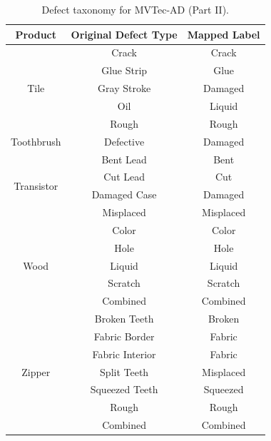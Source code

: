 \begin{table}
\centering
\footnotesize
\caption{Defect taxonomy for MVTec-AD (Part II).}
\label{tab:mvtec-mapping2}
\begin{tabular}{@{}ccc@{}}
\toprule
\textbf{Product} & \textbf{Original Defect Type} & \textbf{Mapped Label} \\
\midrule
\multirow{5}{*}{Tile} & Crack & Crack \\
 & Glue Strip & Glue \\
 & Gray Stroke & Damaged \\
 & Oil & Liquid \\
 & Rough & Rough \\
\midrule
\multirow{1}{*}{Toothbrush} & Defective & Damaged \\
\midrule
\multirow{4}{*}{Transistor} & Bent Lead & Bent \\
 & Cut Lead & Cut \\
 & Damaged Case & Damaged \\
 & Misplaced & Misplaced \\
\midrule
\multirow{5}{*}{Wood} & Color & Color \\
 & Hole & Hole \\
 & Liquid & Liquid \\
 & Scratch & Scratch \\
 & Combined & Combined \\
\midrule
\multirow{7}{*}{Zipper} & Broken Teeth & Broken \\
 & Fabric Border & Fabric \\
 & Fabric Interior & Fabric \\
 & Split Teeth & Misplaced \\
 & Squeezed Teeth & Squeezed \\
 & Rough & Rough \\
 & Combined & Combined \\
\bottomrule
\end{tabular}
\end{table}

